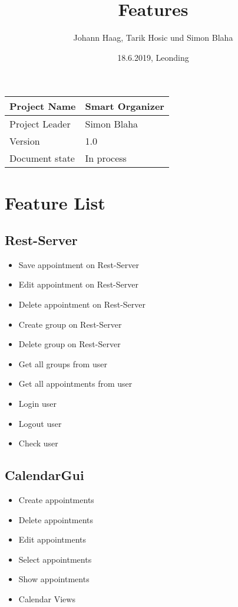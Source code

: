 \documentclass[12pt]{scrartcl}
\title{Features}
\author{Johann Haag, Tarik Hosic und Simon Blaha}
\date{18.6.2019, Leonding}
\begin{document}
    \maketitle
    \begin{flushleft}
    \begin{tabular}{|l|l|}
    \hline
    Project Name & Smart Organizer \\ \hline
    Project Leader & Simon Blaha \\ \hline
    Version & 1.0\\ \hline
    Document state & In process \\ \hline
    \end{tabular}
    \end{flushleft}

    \pagebreak
    \tableofcontents
    \pagebreak

    \section{Feature List}
    \subsection{Rest-Server}
    \begin{itemize}
        \item Save appointment on Rest-Server
        \item Edit appointment on Rest-Server
        \item Delete appointment on Rest-Server
        \item Create group on Rest-Server
        \item Delete group on Rest-Server
        \item Get all groups from user
        \item Get all appointments from user
        \item Login user 
        \item Logout user 
        \item Check user
    \end{itemize}
    \subsection{CalendarGui}
    \begin{itemize}
        \item Create appointments
        \item Delete appointments
        \item Edit appointments
        \item Select appointments
        \item Show appointments
        \item Calendar Views
    \end{itemize}
\end{document}
